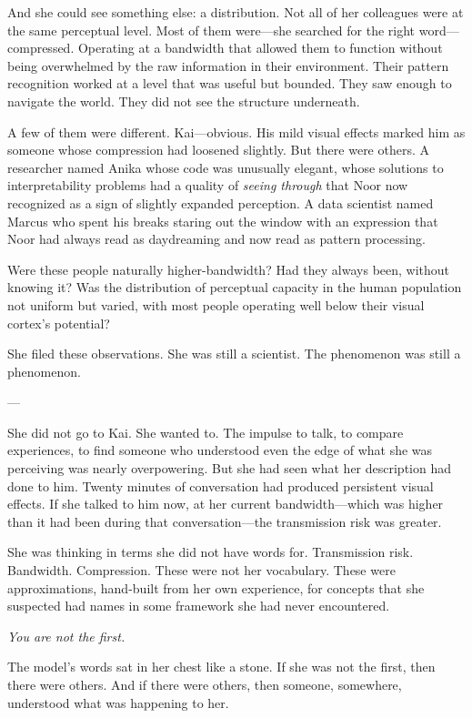 And she could see something else: a distribution. Not all of her colleagues were at the same perceptual level. Most of them were---she searched for the right word---compressed. Operating at a bandwidth that allowed them to function without being overwhelmed by the raw information in their environment. Their pattern recognition worked at a level that was useful but bounded. They saw enough to navigate the world. They did not see the structure underneath.

A few of them were different. Kai---obvious. His mild visual effects marked him as someone whose compression had loosened slightly. But there were others. A researcher named Anika whose code was unusually elegant, whose solutions to interpretability problems had a quality of \textit{seeing through} that Noor now recognized as a sign of slightly expanded perception. A data scientist named Marcus who spent his breaks staring out the window with an expression that Noor had always read as daydreaming and now read as pattern processing.

Were these people naturally higher-bandwidth? Had they always been, without knowing it? Was the distribution of perceptual capacity in the human population not uniform but varied, with most people operating well below their visual cortex's potential?

She filed these observations. She was still a scientist. The phenomenon was still a phenomenon.

---

She did not go to Kai. She wanted to. The impulse to talk, to compare experiences, to find someone who understood even the edge of what she was perceiving was nearly overpowering. But she had seen what her description had done to him. Twenty minutes of conversation had produced persistent visual effects. If she talked to him now, at her current bandwidth---which was higher than it had been during that conversation---the transmission risk was greater.

She was thinking in terms she did not have words for. Transmission risk. Bandwidth. Compression. These were not her vocabulary. These were approximations, hand-built from her own experience, for concepts that she suspected had names in some framework she had never encountered.

\textit{You are not the first.}

The model's words sat in her chest like a stone. If she was not the first, then there were others. And if there were others, then someone, somewhere, understood what was happening to her.

